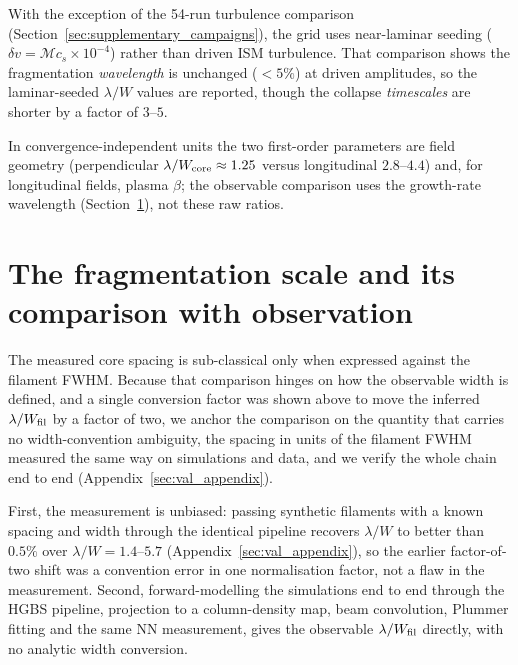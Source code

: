 \documentclass[usenatbib,twoside,twocolumn]{mnras}
\begin{document}
With the exception of the 54-run turbulence comparison (Section~\ref{sec:supplementary_campaigns}), the grid uses near-laminar seeding ($\delta v=\mathcal{M}c_s\times10^{-4}$) rather than driven ISM turbulence. That comparison shows the fragmentation \textit{wavelength} is unchanged ($<5\%$) at driven amplitudes, so the laminar-seeded $\lambda/W$ values are reported, though the collapse \textit{timescales} are shorter by a factor of $3$--$5$.

In convergence-independent units the two first-order parameters are field geometry (perpendicular $\lambda/W_{\rm core}\approx1.25$ versus longitudinal $2.8$--$4.4$) and, for longitudinal fields, plasma $\beta$; the observable comparison uses the growth-rate wavelength (Section~\ref{sec:validation_endtoend}), not these raw ratios.





\section{The fragmentation scale and its comparison with observation}
\label{sec:validation_endtoend}

The measured core spacing is sub-classical only when expressed against the filament FWHM. Because that comparison hinges on how the observable width is defined, and a single conversion factor was shown above to move the inferred $\lambda/W_{\rm fil}$ by a factor of two, we anchor the comparison on the quantity that carries no width-convention ambiguity, the spacing in units of the filament FWHM measured the same way on simulations and data, and we verify the whole chain end to end (Appendix~\ref{sec:val_appendix}).

First, the measurement is unbiased: passing synthetic filaments with a known spacing and width through the identical pipeline recovers $\lambda/W$ to better than $0.5\%$ over $\lambda/W=1.4$--$5.7$ (Appendix~\ref{sec:val_appendix}), so the earlier factor-of-two shift was a convention error in one normalisation factor, not a flaw in the measurement. Second, forward-modelling the simulations end to end through the HGBS pipeline, projection to a column-density map, beam convolution, Plummer fitting and the same NN measurement, gives the observable $\lambda/W_{\rm fil}$ directly, with no analytic width conversion.
\end{document}
